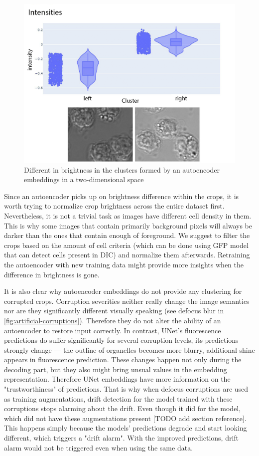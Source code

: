 \begin{figure}[htb]
	\begin{center}
		\includegraphics[width=0.5\linewidth]{bilder/ae-embeddings/brighter-darker.png}
		\caption{Different in brightness in the clusters formed by an autoencoder embeddings in a two-dimensional space}
		\label{fig:ae-brighter-darker}
	\end{center}
\end{figure}

Since an autoencoder picks up on brightness difference within the crops, it is worth trying to normalize crop brightness across the entire dataset first. Nevertheless, it is not a trivial task as images have different cell density in them. This is why some images that contain primarily background pixels will always be darker than the ones that contain enough of foreground. We suggest to filter the crops based on the amount of cell criteria (which can be done using GFP model that can detect cells present in DIC) and normalize them afterwards. Retraining the autoencoder with new training data might provide more insights when the difference in brightness is gone.

It is also clear why autoencoder embeddings do not provide any clustering for corrupted crops. Corruption severities neither really change the image semantics nor are they significantly different visually speaking (see defocus blur in \ref{fig:artificial-corruptions}). Therefore they do not alter the ability of an autoencoder to restore input correctly. In contrast, UNet's fluorescence predictions do suffer significantly for several corruption levels, its predictions strongly change --- the outline of organelles becomes more blurry, additional shine appears in fluorescence prediction. These changes happen not only during the decoding part, but they also might bring unsual values in the embedding representation. Therefore UNet embeddings have more information on the "trustworthiness" of predictions. That is why when defocus corruptions are used as training augmentations, drift detection for the model trained with these corruptions stops alarming about the drift. Even though it did for the model, which did not have these augmentations present [TODO add section reference]. This happens simply because the models' predictions degrade and start looking different, which triggers a "drift alarm". With the improved predictions, drift alarm would not be triggered even when using the same data.
